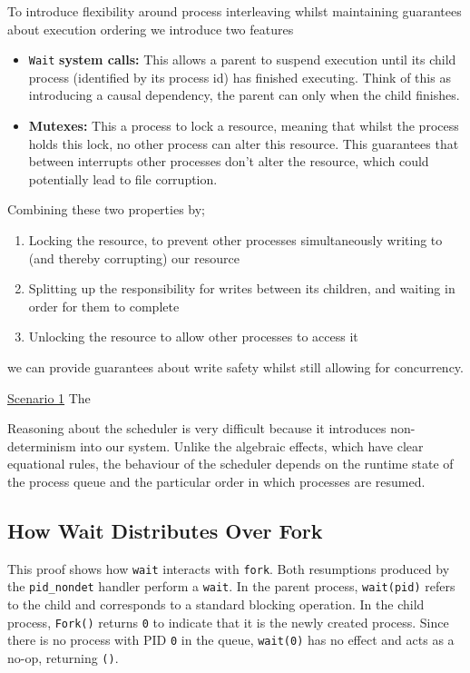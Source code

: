 \documentclass[logo,bsc,singlespacing,parskip]{infthesis}
\begin{document}
To introduce flexibility around process interleaving whilst maintaining guarantees about execution ordering we introduce two features

\begin{itemize}
    \item \lstinline{Wait} \textbf{system calls: } This allows a parent to suspend execution until its child process (identified by its process id) has finished executing. Think of this as introducing a causal dependency, the parent can only when the child finishes.
    \item \textbf{Mutexes: } This a process to lock a resource, meaning that whilst the process holds this lock, no other process can alter this resource. This guarantees that between interrupts other processes don't alter the resource, which could potentially lead to file corruption. 
\end{itemize}

Combining these two properties by;
\begin{enumerate}
    \item Locking the resource, to prevent other processes simultaneously writing to (and thereby corrupting) our resource
    \item Splitting up the responsibility for writes between its children, and waiting in order for them to complete
    \item Unlocking the resource to allow other processes to access it
\end{enumerate}

we can provide guarantees about write safety whilst still allowing for concurrency.
 

\underline{Scenario 1} 
The 


Reasoning about the scheduler is very difficult because it introduces non-determinism into our system. Unlike the algebraic effects, which have clear equational rules, the behaviour of the scheduler depends on the runtime state of the process queue and the particular order in which processes are resumed. 





\subsection*{How Wait Distributes Over Fork}


This proof shows how \texttt{wait} interacts with \texttt{fork}. Both resumptions produced by the \texttt{pid\_nondet} handler perform a \texttt{wait}. In the parent process, \texttt{wait(pid)} refers to the child and corresponds to a standard blocking operation. In the child process, \texttt{Fork()} returns \texttt{0} to indicate that it is the newly created process. Since there is no process with PID \texttt{0} in the queue, \texttt{wait(0)} has no effect and acts as a no-op, returning \texttt{()}.
\end{document}
